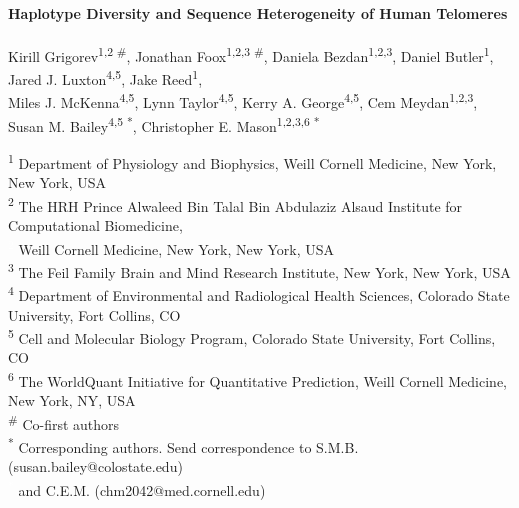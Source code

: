 \documentclass{article}
\begin{document}
\begin{center}
    \Large{\textbf{Haplotype Diversity and Sequence Heterogeneity of Human Telomeres}}
    \\~\\
    \small{
        Kirill Grigorev\textsuperscript{1,2 \#},
        Jonathan Foox\textsuperscript{1,2,3 \#},
        Daniela Bezdan\textsuperscript{1,2,3},
        Daniel Butler\textsuperscript{1},
        Jared J. Luxton\textsuperscript{4,5},
        Jake Reed\textsuperscript{1},
        \\
        Miles J. McKenna\textsuperscript{4,5},
        Lynn Taylor\textsuperscript{4,5},
        Kerry A. George\textsuperscript{4,5},
        Cem Meydan\textsuperscript{1,2,3},
        Susan M. Bailey\textsuperscript{4,5 *},
        Christopher E. Mason\textsuperscript{1,2,3,6 *}
    }
\end{center}

\small{ \noindent
    \textsuperscript{1} Department of Physiology and Biophysics, Weill Cornell Medicine, New York, New York, USA
    \\
    \textsuperscript{2} The HRH Prince Alwaleed Bin Talal Bin Abdulaziz Alsaud Institute for Computational Biomedicine, \\
    \textcolor{white}{\textsuperscript{2}} Weill Cornell Medicine, New York, New York, USA
    \\
    \textsuperscript{3} The Feil Family Brain and Mind Research Institute, New York, New York, USA
    \\
    \textsuperscript{4} Department of Environmental and Radiological Health Sciences, Colorado State University, Fort Collins, CO
    \\
    \textsuperscript{5} Cell and Molecular Biology Program, Colorado State University, Fort Collins, CO
    \\
    \textsuperscript{6} The WorldQuant Initiative for Quantitative Prediction, Weill Cornell Medicine, New York, NY, USA
    \\
    \textsuperscript{\#} Co-first authors
    \\
    \textsuperscript{*} Corresponding authors. Send correspondence to S.M.B. (susan.bailey@colostate.edu) \\
    \textcolor{white}{\textsuperscript{*}} and C.E.M. (chm2042@med.cornell.edu)
}

\normalsize
\doublespacing
\end{document}
